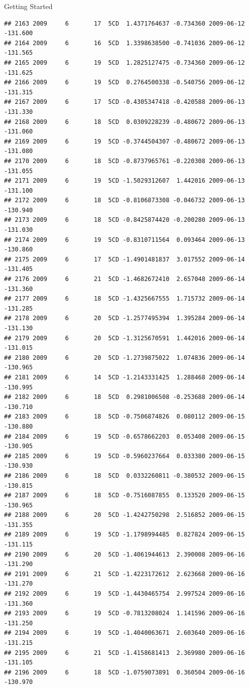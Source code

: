 \documentclass[
  ignorenonframetext,
]{beamer}
\begin{document}
\begin{frame}[fragile]{Getting Started}
\begin{verbatim}
## 2163 2009     6       17  5CD  1.4371764637 -0.734360 2009-06-12 -131.600
## 2164 2009     6       16  5CD  1.3398638500 -0.741036 2009-06-12 -131.565
## 2165 2009     6       19  5CD  1.2825127475 -0.734360 2009-06-12 -131.625
## 2166 2009     6       19  5CD  0.2764500338 -0.540756 2009-06-12 -131.315
## 2167 2009     6       17  5CD -0.4305347418 -0.420588 2009-06-13 -131.330
## 2168 2009     6       18  5CD  0.0309228239 -0.480672 2009-06-13 -131.060
## 2169 2009     6       19  5CD -0.3744504307 -0.480672 2009-06-13 -131.080
## 2170 2009     6       18  5CD -0.8737965761 -0.220308 2009-06-13 -131.055
## 2171 2009     6       19  5CD -1.5029312607  1.442016 2009-06-13 -131.100
## 2172 2009     6       18  5CD -0.8106873308 -0.046732 2009-06-13 -130.940
## 2173 2009     6       18  5CD -0.8425874420 -0.200280 2009-06-13 -131.030
## 2174 2009     6       19  5CD -0.8310711564  0.093464 2009-06-13 -130.860
## 2175 2009     6       17  5CD -1.4901481837  3.017552 2009-06-14 -131.405
## 2176 2009     6       21  5CD -1.4682672410  2.657048 2009-06-14 -131.360
## 2177 2009     6       18  5CD -1.4325667555  1.715732 2009-06-14 -131.285
## 2178 2009     6       20  5CD -1.2577495394  1.395284 2009-06-14 -131.130
## 2179 2009     6       20  5CD -1.3125670591  1.442016 2009-06-14 -131.015
## 2180 2009     6       20  5CD -1.2739875022  1.074836 2009-06-14 -130.965
## 2181 2009     6       14  5CD -1.2143331425  1.288468 2009-06-14 -130.995
## 2182 2009     6       18  5CD  0.2981006508 -0.253688 2009-06-14 -130.710
## 2183 2009     6       18  5CD -0.7506874826  0.080112 2009-06-15 -130.880
## 2184 2009     6       19  5CD -0.6578662203  0.053408 2009-06-15 -130.905
## 2185 2009     6       19  5CD -0.5960237664  0.033380 2009-06-15 -130.930
## 2186 2009     6       18  5CD  0.0332260811 -0.380532 2009-06-15 -130.815
## 2187 2009     6       18  5CD -0.7516087855  0.133520 2009-06-15 -130.965
## 2188 2009     6       20  5CD -1.4242750298  2.516852 2009-06-15 -131.355
## 2189 2009     6       19  5CD -1.1798994485  0.827824 2009-06-15 -131.115
## 2190 2009     6       20  5CD -1.4061944613  2.390008 2009-06-16 -131.290
## 2191 2009     6       21  5CD -1.4223172612  2.623668 2009-06-16 -131.270
## 2192 2009     6       19  5CD -1.4430465754  2.997524 2009-06-16 -131.360
## 2193 2009     6       19  5CD -0.7813208024  1.141596 2009-06-16 -131.250
## 2194 2009     6       19  5CD -1.4040063671  2.603640 2009-06-16 -131.215
## 2195 2009     6       21  5CD -1.4158681413  2.369980 2009-06-16 -131.105
## 2196 2009     6       18  5CD -1.0759073891  0.360504 2009-06-16 -130.970

\end{verbatim}
\end{frame}
\end{document}
